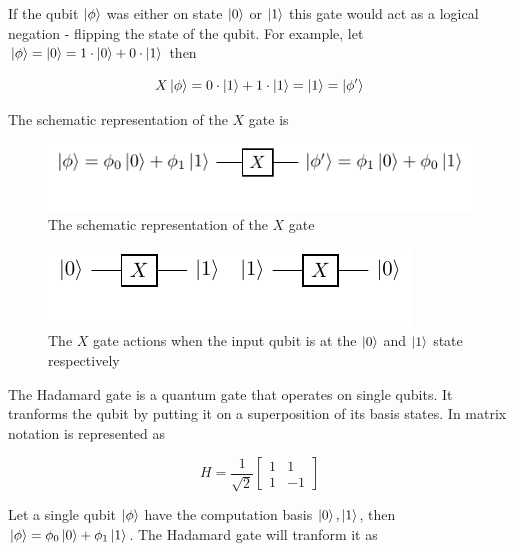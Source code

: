 If the qubit $\ket{\phi}$ was either on state $\ket{0}$ or $\ket{1}$ this gate would
act as a logical negation - flipping the state of the qubit. For example, let
$\ket{\phi} = \ket{0} = 1\cdot\ket{0} + 0\cdot\ket{1}$ then

\begin{equation}
    X\ket{\phi} = 0\cdot\ket{1} + 1\cdot\ket{1} = \ket{1} = \ket{\phi'}
\end{equation}

The schematic representation of the $X$ gate is

\begin{figure}[ht]
    \centering
    \includegraphics{images/3_Quantum_Computing/x_gate.pdf}
    \caption{The schematic representation of the $X$ gate}
\end{figure}

\begin{figure}[ht]
    \centering
    \includegraphics{images/3_Quantum_Computing/x_gate_ex1.pdf}
    \caption{The $X$ gate actions when the input qubit is at the $\ket{0}$ and $\ket{1}$ state respectively}
\end{figure}

The Hadamard gate is a quantum gate that operates on single qubits. It tranforms the qubit by
putting it on a superposition of its basis states. In matrix notation is represented as

\begin{equation}
    H=\frac{1}{\sqrt{2}}\begin{bmatrix}
        1 & 1\\
        1 & -1
    \end{bmatrix}
\end{equation}

Let a single qubit $\ket{\phi}$ have the computation basis $\ket{0},\ket{1}$, then
$\ket{\phi}=\phi_0\ket{0}+\phi_1\ket{1}$. The Hadamard gate will tranform it as

